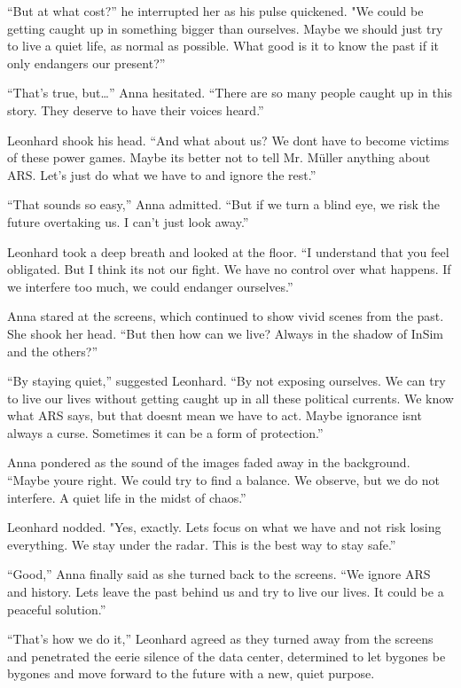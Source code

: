 \documentclass[
]{article}
\begin{document}
``But at what cost?'' he interrupted her as his pulse quickened. "We
could be getting caught up in something bigger than ourselves. Maybe we
should just try to live a quiet life, as normal as possible. What good
is it to know the past if it only endangers our present?''

``That's true, but\ldots'' Anna hesitated. ``There are so many people
caught up in this story. They deserve to have their voices heard.''

Leonhard shook his head. ``And what about us? We don\textquotesingle t
have to become victims of these power games. Maybe it\textquotesingle s
better not to tell Mr. Müller anything about ARS. Let's just do what we
have to and ignore the rest.''

``That sounds so easy,'' Anna admitted. ``But if we turn a blind eye, we
risk the future overtaking us. I can't just look away.''

Leonhard took a deep breath and looked at the floor. ``I understand that
you feel obligated. But I think it\textquotesingle s not our fight. We
have no control over what happens. If we interfere too much, we could
endanger ourselves.''

Anna stared at the screens, which continued to show vivid scenes from
the past. She shook her head. ``But then how can we live? Always in the
shadow of InSim and the others?''

``By staying quiet,'' suggested Leonhard. ``By not exposing ourselves.
We can try to live our lives without getting caught up in all these
political currents. We know what ARS says, but that
doesn\textquotesingle t mean we have to act. Maybe ignorance
isn\textquotesingle t always a curse. Sometimes it can be a form of
protection.''

Anna pondered as the sound of the images faded away in the background.
``Maybe you\textquotesingle re right. We could try to find a balance. We
observe, but we do not interfere. A quiet life in the midst of chaos.''

Leonhard nodded. "Yes, exactly. Let\textquotesingle s focus on what we
have and not risk losing everything. We stay under the radar. This is
the best way to stay safe.''

``Good,'' Anna finally said as she turned back to the screens. ``We
ignore ARS and history. Let\textquotesingle s leave the past behind us
and try to live our lives. It could be a peaceful solution.''

``That's how we do it,'' Leonhard agreed as they turned away from the
screens and penetrated the eerie silence of the data center, determined
to let bygones be bygones and move forward to the future with a new,
quiet purpose.
\end{document}
